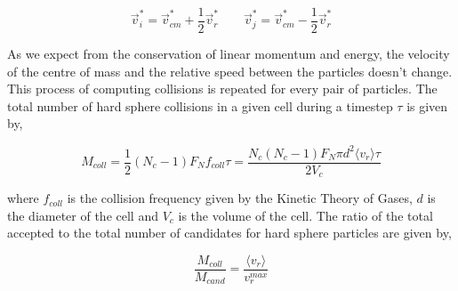 \begin{equation}
	\vec{v}_i^\ast = \vec{v}_{cm}^\ast + \frac{1}{2} \vec{v}_r^\ast \qquad \vec{v}_j^\ast = \vec{v}_{cm}^\ast - \frac{1}{2} \vec{v}_r^\ast
\end{equation}

\no As we expect from the conservation of linear momentum and energy, the velocity of the centre of mass and the relative speed between the particles doesn't change. This process of computing collisions is repeated for every pair of particles. The total number of hard sphere collisions in a given cell during a timestep $\tau$ is given by,

\begin{equation}
	M_{coll} = \frac{1}{2} (N_c - 1) F_N f_{coll} \tau = \frac{N_c (N_c - 1) F_N \pi d^2 \langle v_r \rangle \tau}{2 V_c}
\end{equation}

\no where $f_{coll}$ is the collision frequency given by the Kinetic Theory of Gases, $d$ is the diameter of the cell and $V_c$ is the volume of the cell. The ratio of the total accepted to the total number of candidates for hard sphere particles are given by,

\begin{equation}
	\frac{M_{coll}}{M_{cand}} = \frac{\langle v_r \rangle}{v_r^{max}}
\end{equation}